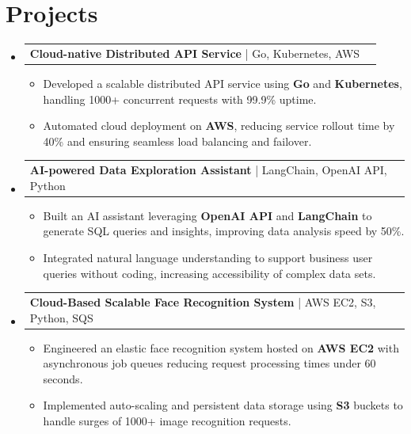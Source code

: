 \documentclass[letterpaper,11pt]{article}
\makeatletter
\newcommand{\resumeItem}[1]{
  \item\footnotesize{
    {#1 \vspace{-2pt}}
  }
}
\newcommand{\resumeProjectHeading}[2]{
    \item
    \begin{tabular*}{1.001\textwidth}{l@{\extracolsep{\fill}}r}
      \small#1 & \textbf{\small #2}\\
    \end{tabular*}\vspace{-7pt}
}
\newcommand{\resumeSubHeadingListStart}{\begin{itemize}[leftmargin=0pt, label={}]}
\newcommand{\resumeSubHeadingListEnd}{\end{itemize}}
\newcommand{\resumeItemListStart}{\begin{itemize}[leftmargin=*]}
\newcommand{\resumeItemListEnd}{\end{itemize}\vspace{-5pt}}
\makeatother
\begin{document}
\section{Projects}
    \vspace{-5pt}
    \resumeSubHeadingListStart
          \resumeProjectHeading
              {\textbf{Cloud-native Distributed API Service} | Go, Kubernetes, AWS}{}
        \resumeItemListStart
            \resumeItem{Developed a scalable distributed API service using \textbf{Go} and \textbf{Kubernetes}, handling 1000+ concurrent requests with 99.9\% uptime.}
            \resumeItem{Automated cloud deployment on \textbf{AWS}, reducing service rollout time by 40\% and ensuring seamless load balancing and failover.}
        \resumeItemListEnd
        \vspace{-12pt}
    
    \resumeProjectHeading
        {\textbf{AI-powered Data Exploration Assistant} | LangChain, OpenAI API, Python}{}
        \resumeItemListStart
            \resumeItem{Built an AI assistant leveraging \textbf{OpenAI API} and \textbf{LangChain} to generate SQL queries and insights, improving data analysis speed by 50\%.}
            \resumeItem{Integrated natural language understanding to support business user queries without coding, increasing accessibility of complex data sets.}
        \resumeItemListEnd
          \vspace{-12pt}
      \resumeProjectHeading
          {\textbf{Cloud-Based Scalable Face Recognition System} | AWS EC2, S3, Python, SQS}{}
          \resumeItemListStart
              \resumeItem{Engineered an elastic face recognition system hosted on \textbf{AWS EC2} with asynchronous job queues reducing request processing times under 60 seconds.}
              \resumeItem{Implemented auto-scaling and persistent data storage using \textbf{S3} buckets to handle surges of 1000+ image recognition requests.}
          \resumeItemListEnd 
    \resumeSubHeadingListEnd
\end{document}
